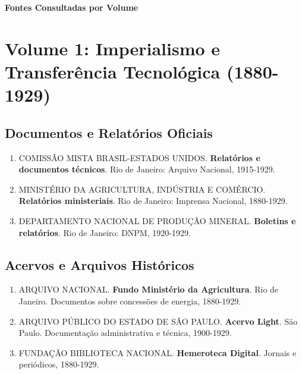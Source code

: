 \documentclass[12pt,a4paper]{report}
\begin{document}
\begin{center}
{\Large\textbf{Fontes Consultadas por Volume}}
\vspace{1cm}
\end{center}

\chapter*{Volume 1: Imperialismo e Transferência Tecnológica (1880-1929)}

\section*{Documentos e Relatórios Oficiais}
\begin{enumerate}[leftmargin=*]
    \item COMISSÃO MISTA BRASIL-ESTADOS UNIDOS. \textbf{Relatórios e documentos técnicos}. Rio de Janeiro: Arquivo Nacional, 1915-1929.
    
    \item MINISTÉRIO DA AGRICULTURA, INDÚSTRIA E COMÉRCIO. \textbf{Relatórios ministeriais}. Rio de Janeiro: Imprensa Nacional, 1880-1929.
    
    \item DEPARTAMENTO NACIONAL DE PRODUÇÃO MINERAL. \textbf{Boletins e relatórios}. Rio de Janeiro: DNPM, 1920-1929.
\end{enumerate}

\section*{Acervos e Arquivos Históricos}
\begin{enumerate}[leftmargin=*]
    \item ARQUIVO NACIONAL. \textbf{Fundo Ministério da Agricultura}. Rio de Janeiro. Documentos sobre concessões de energia, 1880-1929.
    
    \item ARQUIVO PÚBLICO DO ESTADO DE SÃO PAULO. \textbf{Acervo Light}. São Paulo. Documentação administrativa e técnica, 1900-1929.
    
    \item FUNDAÇÃO BIBLIOTECA NACIONAL. \textbf{Hemeroteca Digital}. Jornais e periódicos, 1880-1929.
\end{enumerate}
\end{document}
